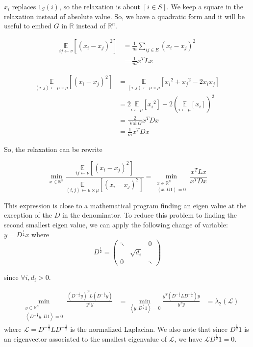 \documentclass[12pt]{article}
\newcommand{\EE}{\mathbb{E}}
\newcommand{\RR}{\mathbb{R}}
\renewcommand{\L}{\mathcal{L}}
\renewcommand{\angle}[1]{\left\langle #1 \right\rangle}
\newcommand{\la}{\leftarrow}
\newcommand{\esp}[2][]{\underset{#1}{\EE}\left[ #2 \right]}
\DeclareMathOperator{\vol}{Vol}
\begin{document}
$x_i$ replaces $1_S(i)$, so the relaxation is about $[i\in S]$. We keep a square in the relaxation instead of absolute value. So, we have a quadratic form and it will be useful to embed $G$ in $\RR$ instead of $\RR^n$.

\[
    \begin{aligned}
        \esp[ij\la\nu]{(x_i-x_j)^2} &= \frac{1}{m} \sum\limits_{ij\in E} (x_i-x_j)^2\\
        &= \frac{1}{m} x^T L x
    \end{aligned}
\]

\[
    \begin{aligned}
        \esp[(i,j) \la \mu\times\mu]{(x_i-x_j)^2} &= \esp[(i,j)\la\mu\times\mu]{{x_i}^2+{x_j}^2-2x_ix_j}\\
        &= 2\esp[i\la \mu]{{x_i}^2} - 2\left( \esp[i\la \mu]{x_i}\right)^2\\
        &= \frac{2}{\vol G} x^T D x\\
        &= \frac{1}{m} x^T D x
    \end{aligned}
\]

So, the relaxation can be rewrite

\[
    \min\limits_{x\in\RR^n} \frac{\esp[ij\la\nu]{(x_i-x_j)^{2}}}{\esp[(i,j)\la\mu\times\mu]{(x_i-x_j)^2}} = \min\limits_{\substack{x\in\RR^n\\\angle{x,D1}=0}} \frac{x^TLx}{x^TDx}
\]


This expression is close to a mathematical program finding an eigen value at the exception of the $D$ in the denominator. To reduce this problem to finding the second smallest eigen value, we can apply the following change of variable: $y = D^{\frac{1}{2}} x$ where 
\[
    D^{\frac{1}{2}} = \left(\begin{matrix}
         \ddots&&0 \\
         & \sqrt{d_i}\\
         0&&\ddots
    \end{matrix}\right)
\]

since $\forall i, d_i >0$.

\[
    \begin{aligned}
        &\min\limits_{\substack{y\in\RR^n\\\angle{D^{- \frac{1}{2}}y,D1}=0}} \frac{(D^{-\frac{1}{2}} y)^T L (D^{-\frac{1}{2}}y)}{y^Ty} &= \min\limits_{\angle{y, D^{\frac{1}{2}}1}=0} \frac{y^T(D^{-\frac{1}{2}}LD^{-\frac{1}{2}})y}{y^T y}
        &= \lambda_2 (\L)
    \end{aligned}
\]
where $\L = D^{-\frac{1}{2}} L D^{-\frac{1}{2}}$ is the normalized Laplacian. We also note that since $D^{\frac{1}{2}}1$ is an eigenvector associated to the smallest eigenvalue of $\L$, we have $\L D^{\frac{1}{2}} 1 =0$.
\end{document}
